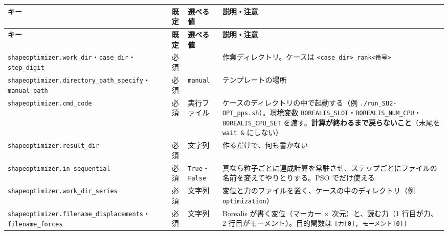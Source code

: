 \begingroup\small
\begin{longtable}{>{\raggedright\arraybackslash}p{}>{\raggedright\arraybackslash}p{}>{\raggedright\arraybackslash}p{}>{\raggedright\arraybackslash}p{}}
\toprule
\textbf{キー} & \textbf{既定} & \textbf{選べる値} & \textbf{説明・注意} \\
\midrule
\endfirsthead
\toprule
\textbf{キー} & \textbf{既定} & \textbf{選べる値} & \textbf{説明・注意} \\
\midrule
\endhead
\bottomrule
\endlastfoot
\texttt{shapeoptimizer.\allowbreak{}work\_\allowbreak{}dir}・\texttt{case\_\allowbreak{}dir}・\texttt{step\_\allowbreak{}digit} & 必須 &  & 作業ディレクトリ。ケースは \texttt{<case\_\allowbreak{}dir>\_\allowbreak{}rank<番号>} \\
\texttt{shapeoptimizer.\allowbreak{}directory\_\allowbreak{}path\_\allowbreak{}specify}・\texttt{manual\_\allowbreak{}path} & 必須 & \texttt{manual} & テンプレートの場所 \\
\texttt{shapeoptimizer.\allowbreak{}cmd\_\allowbreak{}code} & 必須 & 実行ファイル & ケースのディレクトリの中で起動する（例 \texttt{.\allowbreak{}/\allowbreak{}run\_\allowbreak{}SU2-OPT\_\allowbreak{}pps.\allowbreak{}sh}）。環境変数 \texttt{BOREALIS\_\allowbreak{}SLOT}・\texttt{BOREALIS\_\allowbreak{}NUM\_\allowbreak{}CPU}・\texttt{BOREALIS\_\allowbreak{}CPU\_\allowbreak{}SET} を渡す。\textbf{計算が終わるまで戻らないこと}（末尾を \texttt{wait \&} にしない） \\
\texttt{shapeoptimizer.\allowbreak{}result\_\allowbreak{}dir} & 必須 & 文字列 & 作るだけで、何も書かない \\
\texttt{shapeoptimizer.\allowbreak{}in\_\allowbreak{}sequential} & 必須 & \texttt{True}・\texttt{False} & 真なら粒子ごとに連成計算を常駐させ、ステップごとにファイルの名前を変えてやりとりする。PSO でだけ使える \\
\texttt{shapeoptimizer.\allowbreak{}work\_\allowbreak{}dir\_\allowbreak{}series} & 必須 & 文字列 & 変位と力のファイルを置く、ケースの中のディレクトリ（例 \texttt{optimization}） \\
\texttt{shapeoptimizer.\allowbreak{}filename\_\allowbreak{}displacements}・\texttt{filename\_\allowbreak{}forces} & 必須 & 文字列 & Borealis が書く変位（マーカー × 次元）と、読む力（1 行目が力、2 行目がモーメント）。目的関数は \texttt{[力[0]\allowbreak{},\allowbreak{} モーメント[0]\allowbreak{}]\allowbreak{}} \\

\end{longtable}
